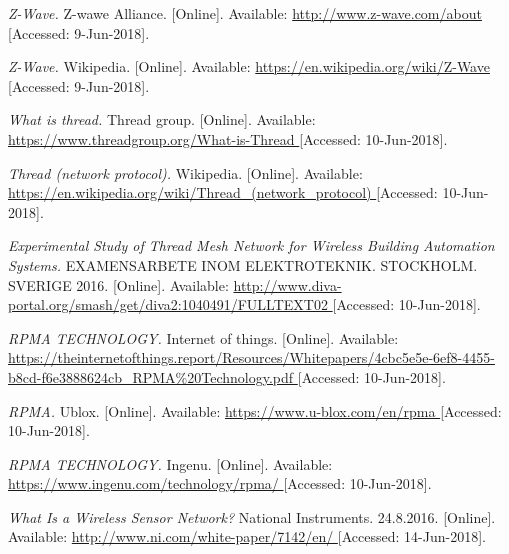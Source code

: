 \begin{thebibliography}{9}

\textit{
Z-Wave.
}
Z-wawe Alliance.
[Online]. Available:
\url{
http://www.z-wave.com/about
}
[Accessed: 9-Jun-2018].


\textit{
Z-Wave.
}
Wikipedia.
[Online]. Available:
\url{
https://en.wikipedia.org/wiki/Z-Wave
}
[Accessed: 9-Jun-2018].



\textit{
What is thread.
}
Thread group.
[Online]. Available:
\url{
https://www.threadgroup.org/What-is-Thread
}
[Accessed: 10-Jun-2018].


\textit{
Thread (network protocol).
}
Wikipedia.
[Online]. Available:
\url{
https://en.wikipedia.org/wiki/Thread_(network_protocol)
}
[Accessed: 10-Jun-2018].


\textit{
Experimental Study of Thread
Mesh Network for Wireless
Building Automation Systems.
}
EXAMENSARBETE INOM ELEKTROTEKNIK. STOCKHOLM. SVERIGE 2016.
[Online]. Available:
\url{
http://www.diva-portal.org/smash/get/diva2:1040491/FULLTEXT02
}
[Accessed: 10-Jun-2018].




\textit{
RPMA TECHNOLOGY.
}
Internet of things.
[Online]. Available:
\url{
https://theinternetofthings.report/Resources/Whitepapers/4cbc5e5e-6ef8-4455-b8cd-f6e3888624cb_RPMA\%20Technology.pdf
}
[Accessed: 10-Jun-2018].

\textit{
RPMA.
}
Ublox.
[Online]. Available:
\url{
https://www.u-blox.com/en/rpma
}
[Accessed: 10-Jun-2018].

\textit{
RPMA TECHNOLOGY.
}
Ingenu.
[Online]. Available:
\url{
https://www.ingenu.com/technology/rpma/
}
[Accessed: 10-Jun-2018].

\textit{
What Is a Wireless Sensor Network?
}
National Instruments. 24.8.2016.
[Online]. Available:
\url{
http://www.ni.com/white-paper/7142/en/
}
[Accessed: 14-Jun-2018].



















\end{thebibliography}
